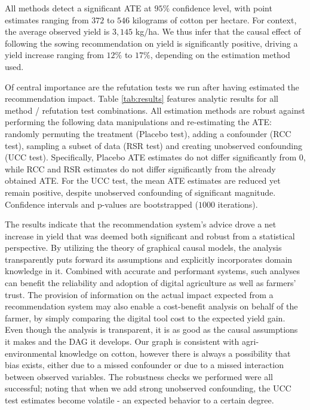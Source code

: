 \documentclass[letterpaper]{article} %
\begin{document}
All methods detect a significant ATE at $95\%$ confidence level, with point estimates ranging from $372$ to $546$ kilograms of cotton per hectare. For context, the average observed yield is $3,145$ kg/ha. We thus infer that the causal effect of following the sowing recommendation on yield is significantly positive, driving a yield increase ranging from $12\%$ to $17\%$, depending on the estimation method used.

Of central importance are the refutation tests we run after having estimated the recommendation impact. Table \ref{tab:results} features analytic results for all method / refutation test combinations. All estimation methods are robust against performing the following data manipulations and re-estimating the ATE: randomly permuting the treatment (Placebo test), adding a confounder (RCC test), sampling a subset of data (RSR test) and creating unobserved confounding (UCC test). Specifically, Placebo ATE estimates do not differ significantly from $0$, while RCC and RSR estimates do not differ significantly from the already obtained ATE. For the UCC test, the mean ATE estimates are reduced yet remain positive, despite unobserved confounding of significant magnitude. Confidence intervals and p-values are bootstrapped ($1000$ iterations).

The results indicate that the recommendation system's advice drove a net increase in yield that was deemed both significant and robust from a statistical perspective. By utilizing the theory of graphical causal models, the analysis transparently puts forward its assumptions and explicitly incorporates domain knowledge in it. Combined with accurate and performant systems, such analyses can benefit the reliability and adoption of digital agriculture as well as farmers' trust. The provision of information on the actual impact expected from a recommendation system may also enable a cost-benefit analysis on behalf of the farmer, by simply comparing the digital tool cost to the expected yield gain.  Even though the analysis is transparent, it is as good as the causal assumptions it makes and the DAG it develops. Our graph is consistent with agri-environmental knowledge on cotton, however there is always a possibility that bias exists, either due to a missed confounder or due to a missed interaction between observed variables. The robustness checks we performed were all successful; noting that when we add strong unobserved confounding, the UCC test estimates become volatile - an expected behavior to a certain degree.
\end{document}
